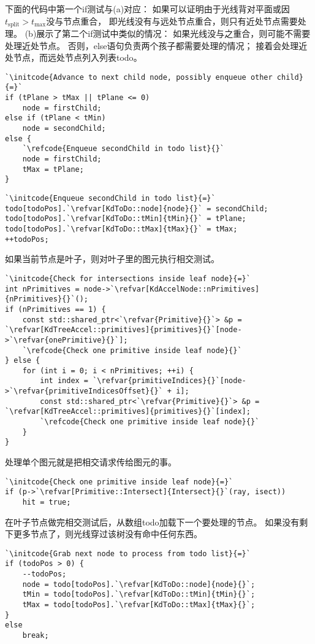 下面的代码中第一个{\ttfamily if}测试与(a)对应：
如果可以证明由于光线背对平面或因$t_{\text{split}}>t_{\max}$没与节点重合，
即光线没有与远处节点重合，则只有近处节点需要处理。
(b)展示了第二个{\ttfamily if}测试中类似的情况：
如果光线没与之重合，则可能不需要处理近处节点。
否则，{\ttfamily else}语句负责两个孩子都需要处理的情况；
接着会处理近处节点，而远处节点列入列表{\ttfamily todo}。
\begin{lstlisting}
`\initcode{Advance to next child node, possibly enqueue other child}{=}`
if (tPlane > tMax || tPlane <= 0)
    node = firstChild;
else if (tPlane < tMin)
    node = secondChild;
else {
    `\refcode{Enqueue secondChild in todo list}{}`
    node = firstChild;
    tMax = tPlane;
}
\end{lstlisting}
\begin{lstlisting}
`\initcode{Enqueue secondChild in todo list}{=}`
todo[todoPos].`\refvar[KdToDo::node]{node}{}` = secondChild;
todo[todoPos].`\refvar[KdToDo::tMin]{tMin}{}` = tPlane;
todo[todoPos].`\refvar[KdToDo::tMax]{tMax}{}` = tMax;
++todoPos;
\end{lstlisting}

如果当前节点是叶子，则对叶子里的图元执行相交测试。
\begin{lstlisting}
`\initcode{Check for intersections inside leaf node}{=}`
int nPrimitives = node->`\refvar[KdAccelNode::nPrimitives]{nPrimitives}{}`();
if (nPrimitives == 1) {
    const std::shared_ptr<`\refvar{Primitive}{}`> &p = `\refvar[KdTreeAccel::primitives]{primitives}{}`[node->`\refvar{onePrimitive}{}`];
    `\refcode{Check one primitive inside leaf node}{}`
} else {
    for (int i = 0; i < nPrimitives; ++i) {
        int index = `\refvar{primitiveIndices}{}`[node->`\refvar{primitiveIndicesOffset}{}` + i];
        const std::shared_ptr<`\refvar{Primitive}{}`> &p = `\refvar[KdTreeAccel::primitives]{primitives}{}`[index];
        `\refcode{Check one primitive inside leaf node}{}`
    }
}
\end{lstlisting}

处理单个图元就是把相交请求传给图元的事。
\begin{lstlisting}
`\initcode{Check one primitive inside leaf node}{=}`
if (p->`\refvar[Primitive::Intersect]{Intersect}{}`(ray, isect)) 
    hit = true;
\end{lstlisting}

在叶子节点做完相交测试后，从数组{\ttfamily todo}加载下一个要处理的节点。
如果没有剩下更多节点了，则光线穿过该树没有命中任何东西。
\begin{lstlisting}
`\initcode{Grab next node to process from todo list}{=}`
if (todoPos > 0) {
    --todoPos;
    node = todo[todoPos].`\refvar[KdToDo::node]{node}{}`;
    tMin = todo[todoPos].`\refvar[KdToDo::tMin]{tMin}{}`;
    tMax = todo[todoPos].`\refvar[KdToDo::tMax]{tMax}{}`;
}
else
    break;
\end{lstlisting}

